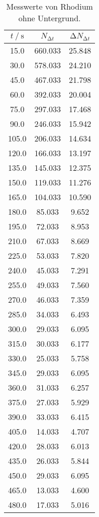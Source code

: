 \begin{table}
 \centering
 \caption{Messwerte von Rhodium ohne Untergrund.}
 \label{tab:rhowahr}
 \begin{tabular}{c c c}
  \toprule
  {$t \mathbin{/} \si{\s}$} & {$N_{\increment t}$} & {$\increment N_{\increment t}$}\\
  \midrule
  15.0   & 660.033  & 25.848    \\
  30.0   & 578.033  & 24.210  \\
  45.0   & 467.033  & 21.798  \\
  60.0   & 392.033  & 20.004  \\
  75.0   & 297.033  & 17.468  \\
  90.0   & 246.033  & 15.942  \\
  105.0  & 206.033  & 14.634  \\
  120.0  & 166.033  & 13.197  \\
  135.0  & 145.033  & 12.375  \\
  150.0  & 119.033  & 11.276  \\
  165.0  & 104.033  & 10.590  \\
  180.0  & 85.033  & 9.652  \\
  195.0  & 72.033  & 8.953  \\
  210.0  & 67.033  & 8.669  \\
  225.0  & 53.033  & 7.820  \\
  240.0  & 45.033  & 7.291  \\
  255.0  & 49.033  & 7.560  \\
  270.0  & 46.033  & 7.359  \\
  285.0  & 34.033  & 6.493  \\
  300.0  & 29.033  & 6.095  \\
  315.0  & 30.033  & 6.177  \\
  330.0  & 25.033  & 5.758  \\
  345.0  & 29.033  & 6.095  \\
  360.0  & 31.033  & 6.257  \\
  375.0  & 27.033  & 5.929  \\
  390.0  & 33.033  & 6.415  \\
  405.0  & 14.033  & 4.707  \\
  420.0  & 28.033  & 6.013  \\
  435.0  & 26.033  & 5.844  \\
  450.0  & 29.033  & 6.095  \\
  465.0  & 13.033  & 4.600  \\
  480.0  & 17.033  & 5.016  \\

\end{tabular}
\end{table}
